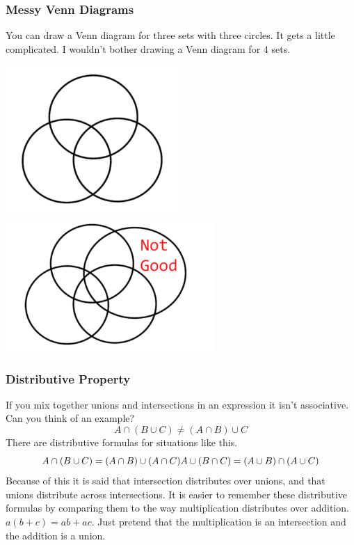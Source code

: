\documentclass[
]{book}
\begin{document}
\hypertarget{messy-venn-diagrams}{%
\subsubsection{Messy Venn Diagrams}\label{messy-venn-diagrams}}

You can draw a Venn diagram for three sets with three circles. It gets a little complicated. I wouldn't bother drawing a Venn diagram for 4 sets.

\includegraphics{Pictures/01-Sets/Venn3.PNG}
\includegraphics{Pictures/01-Sets/Venn4.PNG}

\hypertarget{distributive-property}{%
\subsubsection{Distributive Property}\label{distributive-property}}

If you mix together unions and intersections in an expression it isn't associative. Can you think of an example?
\[A \cap (B \cup C) \not= (A \cap B) \cup C\]
There are distributive formulas for situations like this.
\[A \cap (B \cup C) = (A \cap B) \cup (A \cap C) \\
 A \cup (B \cap C) = (A \cup B) \cap (A \cup C)\]
Because of this it is said that intersection distributes over unions, and that unions distribute across intersections. It is easier to remember these distributive formulas by comparing them to the way multiplication distributes over addition. \(a(b+c)=ab+ac\). Just pretend that the multiplication is an intersection and the addition is a union.
\end{document}
